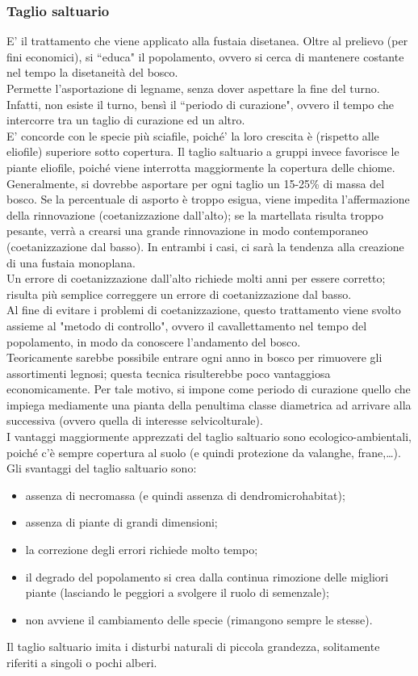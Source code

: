 \documentclass{article}
\begin{document}
\subsubsection{Taglio saltuario}
E' il trattamento che viene applicato alla fustaia disetanea. Oltre al prelievo (per fini economici), si ``educa" il popolamento, ovvero si cerca di mantenere costante nel tempo la disetaneità del bosco.\\
Permette l'asportazione di legname, senza dover aspettare la fine del turno. Infatti, non esiste il turno, bensì il ``periodo di curazione", ovvero il tempo che intercorre tra un taglio di curazione ed un altro.\\
E' concorde con le specie più sciafile, poiché' la loro crescita è (rispetto alle eliofile) superiore sotto copertura. Il taglio saltuario a gruppi invece favorisce le piante eliofile, poiché viene interrotta maggiormente la copertura delle chiome.\\
Generalmente, si dovrebbe asportare per ogni taglio un 15-25\% di massa del bosco. Se la percentuale di asporto è troppo esigua, viene impedita l'affermazione della rinnovazione (coetanizzazione dall'alto); se la martellata risulta troppo pesante, verrà a crearsi una grande rinnovazione in modo contemporaneo (coetanizzazione dal basso). In entrambi i casi, ci sarà la tendenza alla creazione di una fustaia monoplana.\\
Un errore di coetanizzazione dall'alto richiede molti anni per essere corretto; risulta più semplice correggere un errore di coetanizzazione dal basso.\\
Al fine di evitare i problemi di coetanizzazione, questo trattamento viene svolto assieme al "metodo di controllo", ovvero il cavallettamento nel tempo del popolamento, in modo da conoscere l'andamento del bosco.\\
Teoricamente sarebbe possibile entrare ogni anno in bosco per rimuovere gli assortimenti legnosi; questa tecnica risulterebbe poco vantaggiosa economicamente. Per tale motivo, si impone come periodo di curazione quello che impiega mediamente una pianta della penultima classe diametrica ad arrivare alla successiva (ovvero quella di interesse selvicolturale).\\
I vantaggi maggiormente apprezzati del taglio saltuario sono ecologico-ambientali, poiché c'è sempre copertura al suolo (e quindi protezione da valanghe, frane,\dots).\\
Gli svantaggi del taglio saltuario sono:
\begin{itemize}
    \item assenza di necromassa (e quindi assenza di dendromicrohabitat);
    \item assenza di piante di grandi dimensioni;
    \item la correzione degli errori richiede molto tempo;
    \item il degrado del popolamento si crea dalla continua rimozione delle migliori piante (lasciando le peggiori a svolgere il ruolo di semenzale);
    \item non avviene il cambiamento delle specie (rimangono sempre le stesse).
\end{itemize}
Il taglio saltuario imita i disturbi naturali di piccola grandezza, solitamente riferiti a singoli o pochi alberi.
\end{document}
